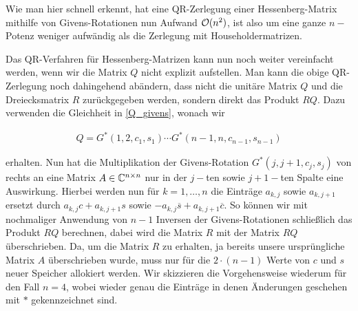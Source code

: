 \documentclass{article}
\theoremstyle{plain}
\begin{document}
Wie man hier schnell erkennt, hat eine QR-Zerlegung einer Hessenberg-Matrix mithilfe von Givens-Rotationen nun Aufwand $\mathcal{O}(n^2)$, ist also um eine ganze $n-$Potenz weniger aufwändig als die Zerlegung mit Householdermatrizen.

Das QR-Verfahren für Hessenberg-Matrizen kann nun noch weiter vereinfacht werden, wenn wir die Matrix $Q$ nicht explizit aufstellen. Man kann die obige QR-Zerlegung noch dahingehend abändern, dass nicht die unitäre Matrix $Q$ und die Dreiecksmatrix $R$ zurückgegeben werden, sondern direkt das Produkt $RQ$. Dazu verwenden die Gleichheit in \eqref{Q_givens}, wonach wir

\begin{align*}
	Q = G^*(1,2,c_1,s_1) \cdots G^*(n-1,n,c_{n-1},s_{n-1})
\end{align*}

erhalten. Nun hat die Multiplikation der Givens-Rotation $G^*(j,j+1, c_j, s_j)$ von rechts an eine Matrix $A \in \mathbb{C}^{n\times n}$ nur in der $j-$ten sowie $j+1-$ten Spalte eine Auswirkung. Hierbei werden nun für $k = 1,\dots,n$ die Einträge $a_{k,j}$ sowie $a_{k,j+1}$ ersetzt durch $a_{k,j}c + a_{k,j+1}s$ sowie $-a_{k,j}\overline{s} + a_{k,j+1}\overline{c}$.
So können wir mit nochmaliger Anwendung von $n-1$ Inversen der Givens-Rotationen schließlich das Produkt $RQ$ berechnen, dabei wird die Matrix $R$ mit der Matrix $RQ$ überschrieben. Da, um die Matrix $R$ zu erhalten, ja bereits unsere ursprüngliche Matrix $A$ überschrieben wurde, muss nur für die $2 \cdot (n-1)$ Werte von $c$ und $s$ neuer Speicher allokiert werden. Wir skizzieren die Vorgehensweise wiederum für den Fall $n=4$, wobei wieder genau die Einträge in denen Änderungen geschehen mit $*$ gekennzeichnet sind.
\end{document}
